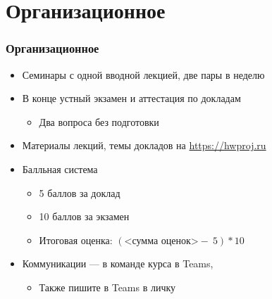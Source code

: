 \documentclass{../../slides-style}
\begin{document}
    \begin{frame}[plain]
        \titlepage
    \end{frame}

    \section{Организационное}

    \begin{frame}
        \frametitle{Организационное}
        \begin{itemize}
            \item Семинары с одной вводной лекцией, две пары в неделю
            \item В конце устный экзамен и аттестация по докладам
            \begin{itemize}
                \item Два вопроса без подготовки
            \end{itemize}
            \item Материалы лекций, темы докладов на \url{https://hwproj.ru}
            \item Балльная система
            \begin{itemize}
                \item 5 баллов за доклад
                \item 10 баллов за экзамен
                \item Итоговая оценка: $(\textrm{<сумма оценок>} -\ 5) * 10$
            \end{itemize}
            \item Коммуникации --- в команде курса в Teams, \url{}
            \begin{itemize}
                \item Также пишите в Teams в личку
            \end{itemize}
        \end{itemize}
    \end{frame}
\end{document}
